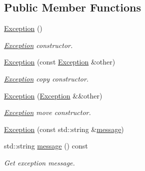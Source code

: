\subsection*{Public Member Functions}
\begin{DoxyCompactItemize}
\item 
\hyperlink{classcreek_1_1_exception_a5b32dab8accc8197dc3e8c6ceee0cab2}{Exception} ()\hypertarget{classcreek_1_1_exception_a5b32dab8accc8197dc3e8c6ceee0cab2}{}\label{classcreek_1_1_exception_a5b32dab8accc8197dc3e8c6ceee0cab2}

\begin{DoxyCompactList}\small\item\em {\ttfamily \hyperlink{classcreek_1_1_exception}{Exception}} constructor. \end{DoxyCompactList}\item 
\hyperlink{classcreek_1_1_exception_ac6168ed4d0735c6d1057b403737374f3}{Exception} (const \hyperlink{classcreek_1_1_exception}{Exception} \&other)\hypertarget{classcreek_1_1_exception_ac6168ed4d0735c6d1057b403737374f3}{}\label{classcreek_1_1_exception_ac6168ed4d0735c6d1057b403737374f3}

\begin{DoxyCompactList}\small\item\em {\ttfamily \hyperlink{classcreek_1_1_exception}{Exception}} copy constructor. \end{DoxyCompactList}\item 
\hyperlink{classcreek_1_1_exception_a04e887ed81769d54d96fe03b1399b1ed}{Exception} (\hyperlink{classcreek_1_1_exception}{Exception} \&\&other)\hypertarget{classcreek_1_1_exception_a04e887ed81769d54d96fe03b1399b1ed}{}\label{classcreek_1_1_exception_a04e887ed81769d54d96fe03b1399b1ed}

\begin{DoxyCompactList}\small\item\em {\ttfamily \hyperlink{classcreek_1_1_exception}{Exception}} move constructor. \end{DoxyCompactList}\item 
\hyperlink{classcreek_1_1_exception_aa9419a4ded37d653f29a8d602b53687d}{Exception} (const std\+::string \&\hyperlink{classcreek_1_1_exception_a1c6434cdf4b8643c77ee35d9d88a1427}{message})
\item 
std\+::string \hyperlink{classcreek_1_1_exception_a1c6434cdf4b8643c77ee35d9d88a1427}{message} () const \hypertarget{classcreek_1_1_exception_a1c6434cdf4b8643c77ee35d9d88a1427}{}\label{classcreek_1_1_exception_a1c6434cdf4b8643c77ee35d9d88a1427}

\begin{DoxyCompactList}\small\item\em Get exception message. \end{DoxyCompactList}\end{DoxyCompactItemize}
